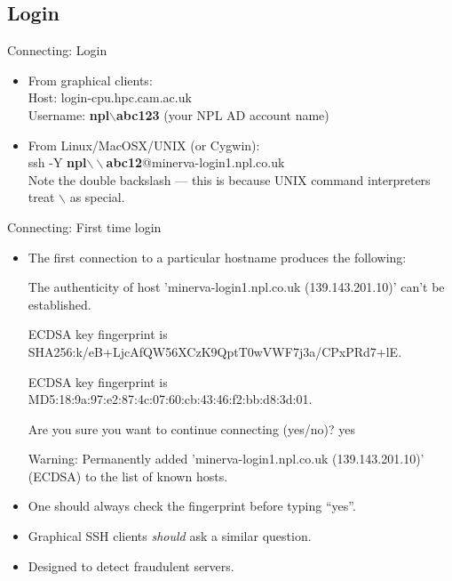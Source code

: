 \subsection{Login}
\begin{frame}{Connecting: Login}
\begin{itemize}
\item From graphical clients:\hfill\\
Host: \alert{login-cpu.hpc.cam.ac.uk}\hfill\\
Username: \alert{\textbf{npl$\backslash$abc123}} (your NPL AD account name)
\pause
\item From Linux/MacOSX/UNIX (or Cygwin):\hfill\\\medskip
  \alert{ssh -Y \textbf{npl$\backslash\backslash$abc12}@minerva-login1.npl.co.uk}\hfill\\\medskip
  Note the double backslash --- this is because UNIX command interpreters treat $\backslash$ as special.
\end{itemize}
\end{frame}

\begin{frame}{Connecting: First time login}
\begin{itemize}
\item{The first connection to a particular hostname produces the following:}
\begin{semiverbatim}\tiny
The authenticity of host 'minerva-login1.npl.co.uk (139.143.201.10)' can't be established.


ECDSA key fingerprint is {SHA256:k/eB+LjcAfQW56XCzK9QptT0wVWF7j3a/CPxPRd7+lE}.

ECDSA key fingerprint is {MD5:18:9a:97:e2:87:4c:07:60:cb:43:46:f2:bb:d8:3d:01}.


Are you sure you want to continue connecting (yes/no)? {yes}

Warning: Permanently added 'minerva-login1.npl.co.uk (139.143.201.10)' (ECDSA) to the list of known hosts.
\end{semiverbatim}
\smallskip\item{\alert{One should always check the fingerprint before typing ``yes''.}}
\item{Graphical SSH clients \emph{should} ask a similar question.}
\item{Designed to detect fraudulent servers.}
\end{itemize}
\end{frame}

